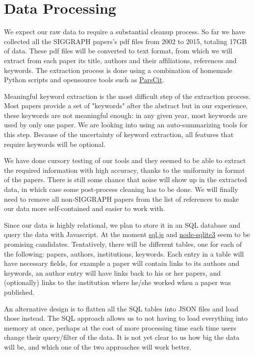 \documentclass[12pt]{article}
\begin{document}
\section{Data Processing}
We expect our raw data to require a substantial cleanup process. So far we have collected all the SIGGRAPH papers's pdf files from 2002 to 2015, totaling 17GB of data. These pdf files will be converted to text format, from which we will extract from each paper its title, authors and their affiliations, references and keywords. The extraction process is done using a combination of homemade Python scripts and opensource tools such as \href{http://aye.comp.nus.edu.sg/parsCit/}{ParsCit}.

Meaningful keyword extraction is the most difficult step of the extraction process. Most papers provide a set of "keywords" after the abstract but in our experience, these keywords are not meaningful enough: in any given year, most keywords are used by only one paper. We are looking into using an auto-summarizing tools for this step. Because of the uncertainty of keyword extraction, all features that require keywords will be optional.

We have done cursory testing of our tools and they seemed to be able to extract the required information with high accuracy, thanks to the uniformity in format of the papers. There is still some chance that noise will show up in the extracted data, in which case some post-process cleaning has to be done. We will finally need to remove all non-SIGGRAPH papers from the list of references to make our data more self-contained and easier to work with.

Since our data is highly relational, we plan to store it in an SQL database and query the data with Javascript. At the moment \href{https://github.com/kripken/sql.js/}{sql.js} and \href{https://github.com/mapbox/node-sqlite3}{node-sqlite3} seem to be promising candidates. Tentatively, there will be different tables, one for each of the following: papers, authors, institutions, keywords. Each entry in a table will have necessary fields, for example a paper will contain links to its authors and keywords, an author entry will have links back to his or her papers, and (optionally) links to the institution where he/she worked when a paper was published.

An alternative design is to flatten all the SQL tables into JSON files and load those instead. The SQL approach allows us to not having to load everything into memory at once, perhaps at the cost of more processing time each time users change their query/filter of the data. It is not yet clear to us how big the data will be, and which one of the two approaches will work better.
\end{document}
